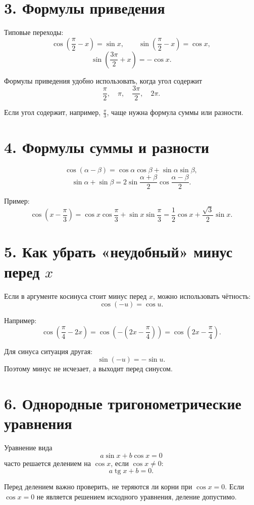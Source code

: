 \documentclass[a4paper,12pt]{article}
\providecommand{\tg}{\operatorname{tg}}
\begin{document}
\section*{3. Формулы приведения}

Типовые переходы:
\[
\cos\left(\frac{\pi}{2}-x\right)=\sin x,
\qquad
\sin\left(\frac{\pi}{2}-x\right)=\cos x,
\]
\[
\sin\left(\frac{3\pi}{2}+x\right)=-\cos x.
\]

Формулы приведения удобно использовать, когда угол содержит
\[
\frac{\pi}{2},\quad \pi,\quad \frac{3\pi}{2},\quad 2\pi.
\]

Если угол содержит, например, \(\frac{\pi}{3}\), чаще нужна формула суммы или разности.

\section*{4. Формулы суммы и разности}

\[
\cos(\alpha-\beta)=\cos\alpha\cos\beta+\sin\alpha\sin\beta,
\]
\[
\sin\alpha+\sin\beta
=
2\sin\frac{\alpha+\beta}{2}\cos\frac{\alpha-\beta}{2}.
\]

Пример:
\[
\cos\left(x-\frac{\pi}{3}\right)
=
\cos x\cos\frac{\pi}{3}+\sin x\sin\frac{\pi}{3}
=
\frac12\cos x+\frac{\sqrt3}{2}\sin x.
\]

\section*{5. Как убрать «неудобный» минус перед \(x\)}

Если в аргументе косинуса стоит минус перед \(x\), можно использовать чётность:
\[
\cos(-u)=\cos u.
\]

Например:
\[
\cos\left(\frac{\pi}{4}-2x\right)
=
\cos\left(-(2x-\frac{\pi}{4})\right)
=
\cos\left(2x-\frac{\pi}{4}\right).
\]

Для синуса ситуация другая:
\[
\sin(-u)=-\sin u.
\]
Поэтому минус не исчезает, а выходит перед синусом.

\section*{6. Однородные тригонометрические уравнения}

Уравнение вида
\[
a\sin x+b\cos x=0
\]
часто решается делением на \(\cos x\), если \(\cos x\ne0\):
\[
a\tg x+b=0.
\]

Перед делением важно проверить, не теряются ли корни при \(\cos x=0\). Если \(\cos x=0\) не является решением исходного уравнения, деление допустимо.
\end{document}
